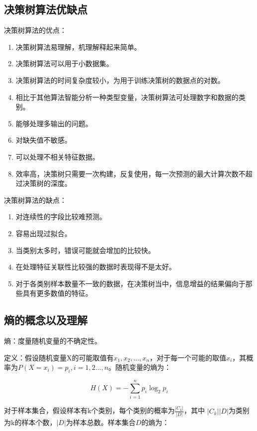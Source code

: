 \subsection{决策树算法优缺点}

决策树算法的优点：

\begin{enumerate}\itemsep0em
		\item 决策树算法易理解，机理解释起来简单。
		\item 决策树算法可以用于小数据集。
		\item 决策树算法的时间复杂度较小，为用于训练决策树的数据点的对数。
		\item 相比于其他算法智能分析一种类型变量，决策树算法可处理数字和数据的类别。
		\item 能够处理多输出的问题。
		\item 对缺失值不敏感。
		\item 可以处理不相关特征数据。
		\item 效率高，决策树只需要一次构建，反复使用，每一次预测的最大计算次数不超过决策树的深度。
\end{enumerate}

决策树算法的缺点：

\begin{enumerate}\itemsep0em
		\item 对连续性的字段比较难预测。
		\item 容易出现过拟合。
		\item 当类别太多时，错误可能就会增加的比较快。
		\item 在处理特征关联性比较强的数据时表现得不是太好。
		\item 对于各类别样本数量不一致的数据，在决策树当中，信息增益的结果偏向于那些具有更多数值的特征。
\end{enumerate}

\subsection{熵的概念以及理解}

熵：度量随机变量的不确定性。

定义：假设随机变量X的可能取值有$x_{1},x_{2},...,x_{n}$，对于每一个可能的取值$x_{i}$，其概率为$P(X=x_{i})=p_{i},i=1,2...,n$。随机变量的熵为：

$$
H(X)=-\sum_{i=1}^{n}p_{i}\log_{2}p_{i}
$$

对于样本集合，假设样本有k个类别，每个类别的概率为$\frac{|C_{k}|}{|D|}$，其中 ${|C_{k}|}{|D|}$为类别为k的样本个数，$|D|$为样本总数。样本集合$D$的熵为：

